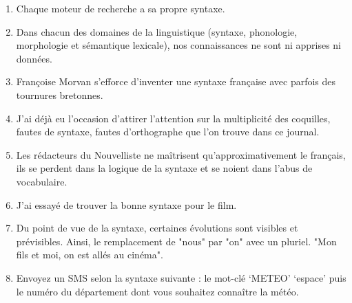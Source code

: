 {    \begin{enumerate}[label=(\arabic*),resume]
    \item Chaque moteur de recherche a sa propre syntaxe.
    \item Dans chacun des domaines de la linguistique (syntaxe, phonologie, morphologie et sémantique lexicale), nos connaissances ne sont ni apprises ni données.
    \item Françoise Morvan s’efforce d’inventer une syntaxe française avec parfois des tournures bretonnes.
    \item J’ai déjà eu l’occasion d’attirer l’attention sur la multiplicité des coquilles, fautes de syntaxe, fautes d’orthographe que l’on trouve dans ce journal.
    \item Les rédacteurs du Nouvelliste ne maîtrisent qu’approximativement le français, ils se perdent dans la logique de la syntaxe et se noient dans l’abus de vocabulaire.
    \item J’ai essayé de trouver la bonne syntaxe pour le film.
    \item Du point de vue de la syntaxe, certaines évolutions sont visibles et prévisibles. Ainsi, le remplacement de "nous" par "on" avec un pluriel. "Mon fils et moi, on est allés au cinéma".
    \item Envoyez un SMS selon la syntaxe suivante : le mot-clé ‘METEO’ ‘espace’ puis le numéro du département dont vous souhaitez connaître la météo.
    \end{enumerate}
 }

